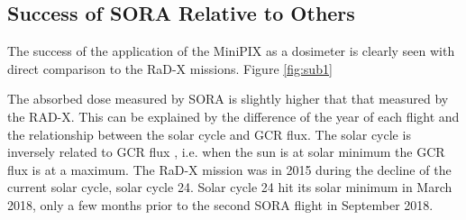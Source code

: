 \subsection{Success of SORA Relative to Others}


The success of the application of the MiniPIX as a dosimeter is clearly seen with direct comparison to the RaD-X missions. Figure \ref{fig:sub1}

The absorbed dose measured by SORA is slightly higher that that measured by the RAD-X. This can be explained by the difference of the year of each flight and the relationship between the solar cycle and GCR flux. The solar cycle is inversely related to GCR flux \cite{hathaway}, i.e. when the sun is at solar minimum the GCR flux is at a maximum. The RaD-X mission was in 2015 during the decline of the current solar cycle, solar cycle \num{24}. Solar cycle 24 hit its solar minimum in March 2018, only a few months prior to the second SORA flight in September 2018.



